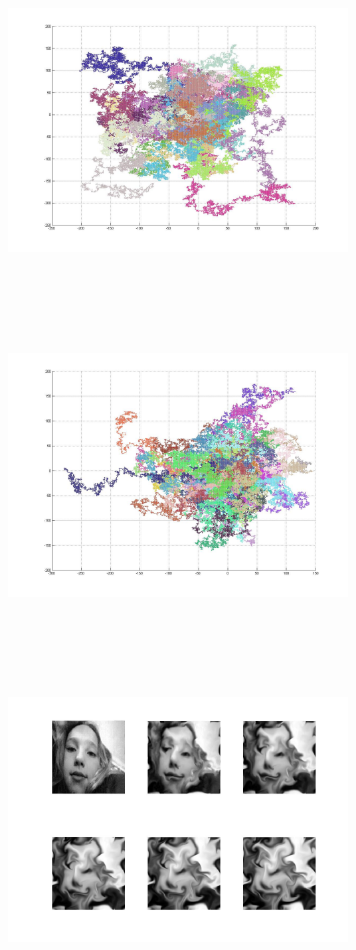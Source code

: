 \includegraphics[width=9.0cm,height=9.0cm]{images/GraphTheory/RandomWalk_30_Walkers_20000_steps.jpg}
\includegraphics[width=9.0cm,height=9.0cm]{images/GraphTheory/RandomWalk_50_Walkers.jpg}
\includegraphics[width=9.0cm,height=9.0cm]{images/GraphTheory/Raymond_AdvectiveNavierStokesdiffusion.jpg}
